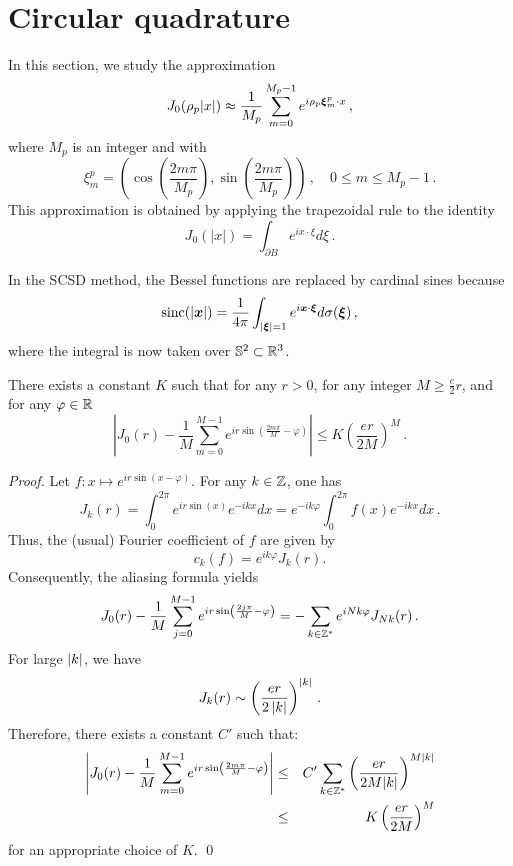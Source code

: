 \documentclass[main]{subfiles}
\begin{document}
\section{Circular quadrature}
\label{sec:circular}
In this section, we study the approximation
\[ J_0(\rho_p|x|) \approx \dfrac{1}{M_p}\sum_{m=0}^{M_p-1}e^{i \rho_p \boldsymbol{\xi}^p_m \cdot x}\,, \]
where $M_p$ is an integer and with
\begin{equation}
\label{defXimp}
\xi_m^p = \left(\cos\left(\frac{2 m \pi}{M_p}\right),\sin\left(\frac{2 m\pi }{M_p}\right)\right)\,, \quad 0 \leq m \leq M_p - 1\,.
\end{equation} 
This approximation is obtained by applying the trapezoidal rule to the identity 
\[ J_0(|x|) = \int_{\partial B} e^{i x \cdot \xi} d\xi\,.\]
\begin{remark}
	In the SCSD method, the Bessel functions are replaced by cardinal sines because
	\[ \textup{sinc}(\left\lvert \boldsymbol{x} \right\rvert) =  \frac{1}{4\pi}\int_{\left\lvert \boldsymbol{\xi} \right\rvert=1} e^{i \boldsymbol{x}\cdot \boldsymbol{\xi}} d\sigma(\boldsymbol{\xi}) \,, \]
	where the integral is now taken over $\mathbb {S}^2 \subset \mathbb{R}^3$. 
\end{remark}
\begin{theorem} There exists a constant $K$ such that for any $r>0$, for any integer $M \geq \frac{e}{2}r$, and for any $\varphi \in \mathbb{R}$ 
	\[\left|J_0(r) -  \dfrac{1}{M}\sum_{m=0}^{M-1}e^{ir\sin\left(\frac{2m\pi}{M}-\varphi\right)} \right| \leq K \left(\dfrac{er}{2M}\right)^M\,.\]
	\label{QuadratureCirc}
\end{theorem}
\begin{proof}
	Let $f : x \mapsto e^{ir\sin(x - \varphi)}$. For any $k \in \mathbb{Z}$, one has
	\[J_k(r) =  \int_{0}^{2\pi}e^{ir\sin(x)}e^{-ikx}dx =  e^{-ik\varphi}\int_{0}^{2\pi}f(x)e^{-ikx}dx\,.\] 
	Thus, the (usual) Fourier coefficient of $f$ are given by 
	\[c_k(f) = e^{ik\varphi}J_k(r).\]
	Consequently, the aliasing formula yields 
	\[J_0(r) -  \dfrac{1}{M} \sum_{j=0}^{M-1} e^{ir \sin \left( \frac{2j\pi}{M}-\varphi \right)} = -\sum_{k\in \mathbb{Z}^*}e^{iNk\varphi}J_{Nk}(r)\,.\] 
	For large $\left\lvert k \right\rvert$, we have
	\[J_k(r) \sim \left(\dfrac{er}{2\left\lvert k \right\rvert}\right)^{\left\lvert k \right\rvert}\,.\]
	Therefore, there exists a constant $C'$ such that: 
	\begin{eqnarray*}
		\left\lvert J_0(r) -  \dfrac{1}{M}\sum_{m=0}^{M-1}e^{ir\sin\left(\frac{2m\pi}{M}-\varphi\right)} \right\rvert &\leq& C' \sum_{k\in \mathbb{Z}^*} \left(\dfrac{er}{2M|k|}\right)^{M|k|}\\
		&\leq& K \left(\dfrac{er}{2M}\right)^M 
	\end{eqnarray*}
	for an appropriate choice of $K$.	
	\qed
\end{proof}
\end{document}
